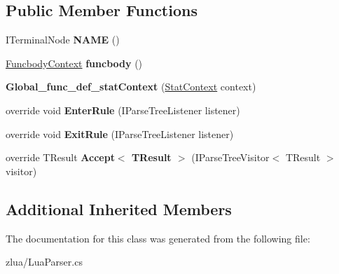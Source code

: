 \subsection*{Public Member Functions}
\begin{DoxyCompactItemize}
\item 
\mbox{\label{classzlua_1_1_lua_parser_1_1_global__func__def__stat_context_a31f90896b81a2a28d6b66eaff2f43ff5}} 
I\+Terminal\+Node {\bfseries N\+A\+ME} ()
\item 
\mbox{\label{classzlua_1_1_lua_parser_1_1_global__func__def__stat_context_a2cadca10c4f416916ca925cd88b86f98}} 
\mbox{\hyperlink{classzlua_1_1_lua_parser_1_1_funcbody_context}{Funcbody\+Context}} {\bfseries funcbody} ()
\item 
\mbox{\label{classzlua_1_1_lua_parser_1_1_global__func__def__stat_context_af2988c25b7f5406446d70c7cdbfdf44b}} 
{\bfseries Global\+\_\+func\+\_\+def\+\_\+stat\+Context} (\mbox{\hyperlink{classzlua_1_1_lua_parser_1_1_stat_context}{Stat\+Context}} context)
\item 
\mbox{\label{classzlua_1_1_lua_parser_1_1_global__func__def__stat_context_a6253a97793b43947e98a072d107ad865}} 
override void {\bfseries Enter\+Rule} (I\+Parse\+Tree\+Listener listener)
\item 
\mbox{\label{classzlua_1_1_lua_parser_1_1_global__func__def__stat_context_ac5ab079cb34c61bfa3b741fd9a598387}} 
override void {\bfseries Exit\+Rule} (I\+Parse\+Tree\+Listener listener)
\item 
\mbox{\label{classzlua_1_1_lua_parser_1_1_global__func__def__stat_context_ae5d455bf3e389df7413e1ca4b7c9a809}} 
override T\+Result {\bfseries Accept$<$ T\+Result $>$} (I\+Parse\+Tree\+Visitor$<$ T\+Result $>$ visitor)
\end{DoxyCompactItemize}
\subsection*{Additional Inherited Members}


The documentation for this class was generated from the following file\+:\begin{DoxyCompactItemize}
\item 
zlua/Lua\+Parser.\+cs\end{DoxyCompactItemize}
